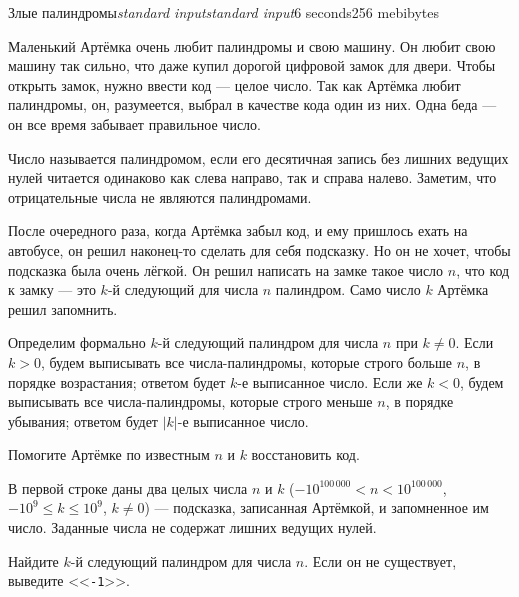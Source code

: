 \begin{problem}{Злые палиндромы}{\textsl{standard input}}{\textsl{standard input}}{6 seconds}{256 mebibytes}{}

Маленький Артёмка очень любит палиндромы и свою машину. Он любит свою машину так сильно, что даже купил дорогой цифровой замок для двери. Чтобы открыть замок, нужно ввести код --- целое число. Так как Артёмка любит палиндромы, он, разумеется, выбрал в качестве кода один из них. Одна беда --- он все время забывает правильное число.

Число называется палиндромом, если его десятичная запись без лишних ведущих нулей читается одинаково как слева направо, так и справа налево. Заметим, что отрицательные числа не являются палиндромами.

После очередного раза, когда Артёмка забыл код, и ему пришлось ехать на автобусе, он решил наконец-то сделать для себя подсказку. Но он не хочет, чтобы подсказка была очень лёгкой. Он решил написать на замке такое число $n$, что код к замку --- это $k$-й следующий для числа $n$ палиндром. Само число $k$ Артёмка решил запомнить.

Определим формально $k$-й следующий палиндром для числа $n$ при $k \ne 0$. Если $k > 0$, будем выписывать все числа-палиндромы, которые строго больше $n$, в порядке возрастания; ответом будет $k$-е выписанное число. Если же $k < 0$, будем выписывать все числа-палиндромы, которые строго меньше $n$, в порядке убывания; ответом будет $|k|$-е выписанное число.

Помогите Артёмке по известным $n$ и $k$ восстановить код.

\InputFile
В первой строке даны два целых числа $n$ и $k$ ($-10^{100\,000} < n < 10^{100\,000}$, $-10^9 \le k \le 10^9$, $k \ne 0$) --- подсказка, записанная Артёмкой, и запомненное им число. Заданные числа не содержат лишних ведущих нулей.

\OutputFile
Найдите $k$-й следующий палиндром для числа $n$. Если он не существует, выведите <<\texttt{-1}>>.

\Examples

\begin{example}
%
%
%
%
\end{example}

\end{problem}
